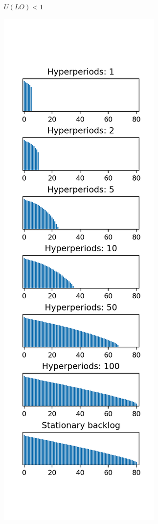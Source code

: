 \documentclass[a4paper,oneside]{csthesis}
\begin{document}
\begin{figure}[p]
\begin{subfigure}[c]{0.3\textwidth}
        \caption{$U(LO) < 1$}\label{subfig:backlogs0}
    \end{subfigure}
    \quad
    \begin{subfigure}[c]{0.3\textwidth}
        \includegraphics[width=\textwidth]{figures/ex_backlogs1.png}

\end{subfigure}
\end{figure}
\end{document}

